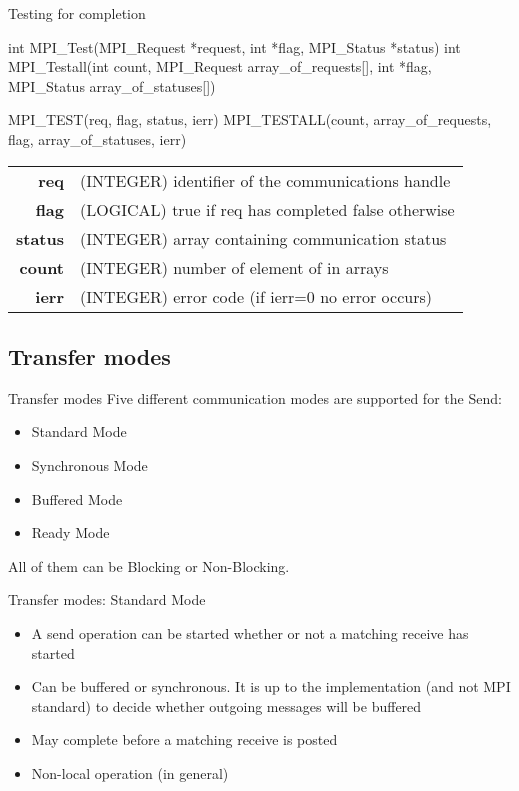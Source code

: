 \documentclass[aspectratio=43]{beamer}
\begin{document}
\begin{frame}[fragile]{Testing for completion}
\begin{Cpplisting}[]{}
int MPI_Test(MPI_Request *request, int *flag, MPI_Status *status)
int MPI_Testall(int count, MPI_Request array_of_requests[], int *flag, MPI_Status array_of_statuses[])
\end{Cpplisting}
\begin{Fortranlisting}[]{}
MPI_TEST(req, flag, status, ierr)
MPI_TESTALL(count, array_of_requests, flag, array_of_statuses, ierr)
\end{Fortranlisting}
\begin{black1block}{}
\begin{tabular}{rl}
    \textbf{req} & (INTEGER) identifier of the communications handle\\
    \textbf{flag} & (LOGICAL) true if req has completed false otherwise\\
    \textbf{status} & (INTEGER) array containing communication status\\
    \textbf{count} & (INTEGER) number of element of in arrays\\
    \textbf{ierr} & (INTEGER) error code (if ierr=0 no error occurs)\\
\end{tabular}
\end{black1block}
\end{frame}

\subsection{Transfer modes}
\begin{frame}{Transfer modes}
Five different communication modes are supported for the Send:
\begin{itemize}
    \item Standard Mode
    \item Synchronous Mode
    \item Buffered Mode
    \item Ready Mode
\end{itemize}
All of them can be Blocking or Non-Blocking.
\end{frame}


\begin{frame}{Transfer modes: Standard Mode}
\begin{itemize}
\item A send operation can be started whether or not a matching receive has started
\item Can be buffered or synchronous. It is up to the implementation (and not MPI standard) to decide whether outgoing messages will be buffered
\item May complete before a matching receive is posted
\item Non-local operation (in general)
\end{itemize}
\end{frame}
\end{document}
